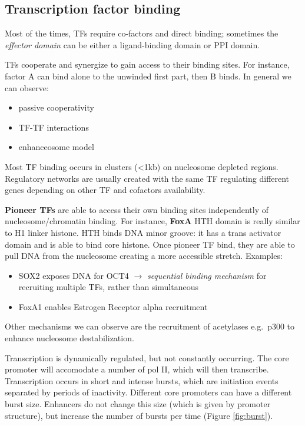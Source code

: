 \hypertarget{transcription-factor-binding}{%
\subsection{Transcription factor binding}\label{transcription-factor-binding}}

Most of the times, TFs require co-factors and direct binding; sometimes the \emph{effector domain} can be either a ligand-binding domain or PPI domain.

TFs cooperate and synergize to gain access to their binding sites. For instance, factor A can bind alone to the unwinded first part, then B binds. In general we can observe:

\begin{itemize}
\tightlist
\item
  passive cooperativity
\item
  TF-TF interactions
\item
  enhanceosome model
\end{itemize}

Most TF binding occurs in clusters (\textless1kb) on nucleosome depleted regions. Regulatory networks are usually created with the same TF regulating different genes depending on other TF and cofactors availability.

\textbf{Pioneer TFs} are able to access their own binding sites independently of nucleosome/chromatin binding. For instance, \textbf{FoxA} HTH domain is really similar to H1 linker histone. HTH binds DNA minor groove: it has a trans activator domain and is able to bind core histone. Once pioneer TF bind, they are able to pull DNA from the nucleosome creating a more accessible stretch. Examples:

\begin{itemize}
\tightlist
\item
  SOX2 exposes DNA for OCT4 $\rightarrow$ \emph{sequential binding mechanism} for recruiting multiple TFs\emph{,} rather than simultaneous
\item
  FoxA1 enables Estrogen Receptor alpha recruitment
\end{itemize}

Other mechanisms we can observe are the recruitment of acetylases e.g.~p300 to enhance nucleosome destabilization.

Transcription is dynamically regulated, but not constantly occurring. The core promoter will accomodate a number of pol II, which will then transcribe. Transcription occurs in short and intense bursts, which are initiation events separated by periods of inactivity. Different core promoters can have a different burst size. Enhancers do not change this size (which is given by promoter structure), but increase the number of bursts per time (Figure \ref{fig:burst}).


